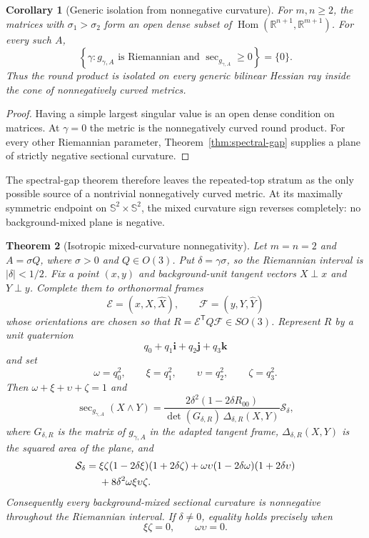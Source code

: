 \documentclass[11pt]{amsart}
\newtheorem{theorem}{Theorem}[section]
\newtheorem{corollary}[theorem]{Corollary}
\theoremstyle{definition}
\theoremstyle{remark}
\DeclareMathOperator{\secop}{sec}
\newcommand{\R}{\mathbb R}
\newcommand{\Sph}{\mathbb S}
\begin{document}
\begin{corollary}[Generic isolation from nonnegative curvature]
\label{cor:generic-isolation}
For $m,n\geq2$, the matrices with $\sigma_1>\sigma_2$ form an open
dense subset of
$\operatorname{Hom}(\R^{n+1},\R^{m+1})$.  For every such $A$,
\[
 \left\{\gamma:
  g_{\gamma,A}\text{ is Riemannian and }\secop_{g_{\gamma,A}}\geq0
 \right\}=\{0\}.
\]
Thus the round product is isolated on every generic bilinear Hessian
ray inside the cone of nonnegatively curved metrics.
\end{corollary}

\begin{proof}
Having a simple largest singular value is an open dense condition on
matrices.  At $\gamma=0$ the metric is the nonnegatively curved round
product.  For every other Riemannian parameter,
Theorem~\ref{thm:spectral-gap} supplies a plane of strictly negative
sectional curvature.
\end{proof}

The spectral-gap theorem therefore leaves the repeated-top stratum as the
only possible source of a nontrivial nonnegatively curved metric.  At its
maximally symmetric endpoint on $\Sph^2\times\Sph^2$, the mixed
curvature sign reverses completely: no background-mixed plane is
negative.

\begin{theorem}[Isotropic mixed-curvature nonnegativity]
\label{thm:isotropic-mixed}
Let $m=n=2$ and $A=\sigma Q$, where $\sigma>0$ and $Q\in O(3)$.
Put $\delta=\gamma\sigma$, so the Riemannian interval is
$|\delta|<1/2$.  Fix a point $(x,y)$ and background-unit tangent
vectors $X\perp x$ and $Y\perp y$.  Complete them to orthonormal
frames
\[
 \mathcal E=(x,X,\widehat X),\qquad
 \mathcal F=(y,Y,\widehat Y)
\]
whose orientations are chosen so that
$R=\mathcal E^{\mathsf T}Q\mathcal F\in SO(3)$.  Represent $R$ by a
unit quaternion
\[
 q_0+q_1\mathbf i+q_2\mathbf j+q_3\mathbf k
\]
and set
\[
 \omega=q_0^2,\qquad \xi=q_1^2,\qquad
 \upsilon=q_2^2,\qquad \zeta=q_3^2.
\]
Then $\omega+\xi+\upsilon+\zeta=1$ and
\begin{equation}\label{eq:isotropic-curvature}
 \secop_{g_{\gamma,A}}(X\wedge Y)
 =\frac{2\delta^2(1-2\delta R_{00})}
        {\det(G_{\delta,R})\,\Delta_{\delta,R}(X,Y)}
   \mathcal S_\delta,
\end{equation}
where $G_{\delta,R}$ is the matrix of $g_{\gamma,A}$ in the adapted
tangent frame, $\Delta_{\delta,R}(X,Y)$ is the squared area of the
plane, and
\begin{align}
 \mathcal S_\delta={}&
 \xi\zeta(1-2\delta\xi)(1+2\delta\zeta)
 +\omega\upsilon(1-2\delta\omega)(1+2\delta\upsilon)
 \notag\\
 &+8\delta^2\omega\xi\upsilon\zeta.       \label{eq:isotropic-sos}
\end{align}
Consequently every background-mixed sectional curvature is
nonnegative throughout the Riemannian interval.  If $\delta\neq0$,
equality holds precisely when
\[
 \xi\zeta=0,\qquad \omega\upsilon=0.
\]
\end{theorem}
\end{document}

